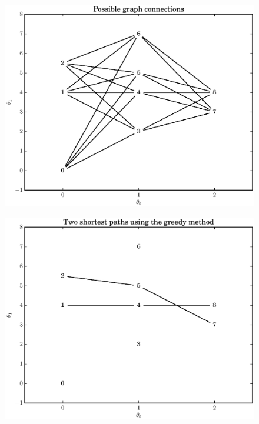 \documentclass[letterpaper,12pt]{report}
\begin{document}
\begin{figure}
    \caption{\label{plot:simple_graph}}
    \includegraphics[width=\textwidth]{plots/small_graph_ex.eps}
\end{figure}

\begin{figure}
    \caption{\label{plot:simple_graph_greedy_paths}}
    \includegraphics[width=\textwidth]{plots/small_graph_ex_greedy_paths.eps}
\end{figure}
\end{document}
